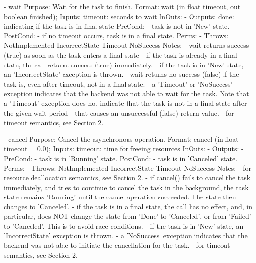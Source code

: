 \begin{myspec}
 
    - wait
      Purpose:  Wait for the task to finish.
      Format:   wait                 (in  float   timeout,
                                      out boolean finished);
      Inputs:   timeout:              seconds to wait
      InOuts:   -
      Outputs:  done:                 indicating if the task
                                      is in final state
      PreCond:  - task is not in 'New' state.
      PostCond: - if no timeout occurs, task is in a final 
                  state.
      Perms:    -
      Throws:   NotImplemented
                IncorrectState
                Timeout
                NoSuccess
      Notes:    - wait returns success (true) as soon as the
                  task enters a final state
                - if the task is already in a final state, the
                  call returns success (true) immediately.
                - if the task is in 'New' state, an
                  'IncorrectState' exception is thrown.
                - wait returns no success (false) if the task 
                  is, even after timeout, not in a final state.
                - a 'Timeout' or 'NoSuccess' exception indicates
                  that the backend was not able to wait for the
                  task.  Note that a 'Timeout' exception does
                  not indicate that the task is not in a final
                  state after the given wait period - that
                  causes an unsuccessful (false) return value.
                - for timeout semantics, see Section 2.
 
 
    - cancel
      Purpose:  Cancel the asynchronous operation.
      Format:   cancel               (in  float  timeout = 0.0);
      Inputs:   timeout:              time for freeing resources
      InOuts:   -
      Outputs:  -
      PreCond:  - task is in 'Running' state.
      PostCond: - task is in 'Canceled' state.
      Perms:    -
      Throws:   NotImplemented
                IncorrectState
                Timeout
                NoSuccess
      Notes:    - for resource deallocation semantics, see 
                  Section 2.
                - if cancel() fails to cancel the task
                  immediately, and tries to continue to cancel
                  the task in the background, the task state 
                  remains 'Running' until the cancel operation 
                  succeeded.  The state then changes to 
                  'Canceled'.
                - if the task is in a final state, the call has
                  no effect, and, in particular, does NOT change
                  the state from 'Done' to 'Canceled', or from 
                  'Failed' to 'Canceled'.  This is to
                  avoid race conditions.
                - if the task is in 'New' state, an
                  'IncorrectState' exception is thrown.
                - a 'NoSuccess' exception indicates
                  that the backend was not able to initiate the
                  cancellation for the task.
                - for timeout semantics, see Section 2.
 

\end{myspec}
